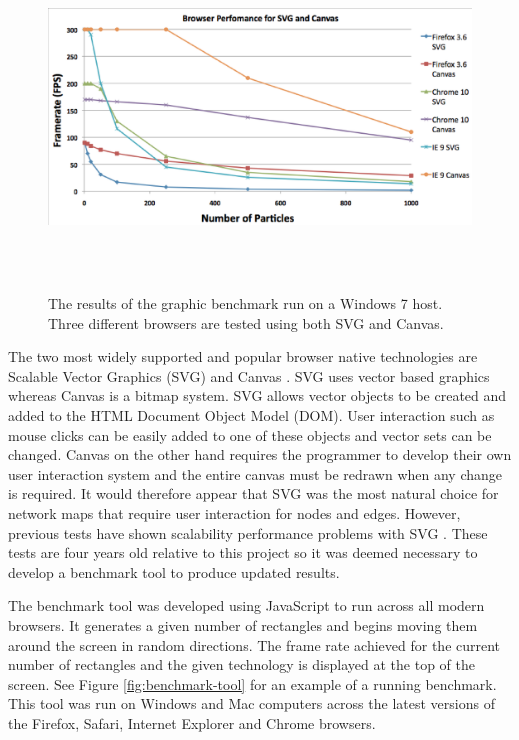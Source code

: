 \documentclass[11pt, a4paper]{article}
\begin{document}
\begin{figure}
\centering
\includegraphics[width=170mm,height=91.67mm]{assets/benchmark-graph.eps}
\caption{The results of the graphic benchmark run on a Windows 7 host. Three
different browsers are tested using both SVG and Canvas.}
\label{fig:benchmark-graph}
\end{figure}

The two most widely supported and popular browser native technologies are
Scalable Vector Graphics (SVG) \cite{Ferraiolo_2003} and Canvas
\cite{Canvas_website}. SVG uses vector based graphics whereas Canvas is a bitmap
system. SVG allows vector objects to be created and added to the HTML Document
Object Model (DOM). User interaction such as mouse clicks can be easily added to
one of these objects and vector sets can be changed. Canvas on the other hand
requires the programmer to develop their own user interaction system and the
entire canvas must be redrawn when any change is required. It would therefore
appear that SVG was the most natural choice for network maps that require user
interaction for nodes and edges. However, previous tests have shown scalability
performance problems with SVG \cite{Johnson_2008}. These tests are four years
old relative to this project so it was deemed necessary to develop a benchmark
tool to produce updated results.

The benchmark tool was developed using JavaScript to run across all modern
browsers. It generates a given number of rectangles and begins moving them
around the screen in random directions. The frame rate achieved for the current
number of rectangles and the given technology is displayed at the top of the
screen. See Figure \ref{fig:benchmark-tool} for an example of a running
benchmark. This tool was run on Windows and Mac computers across the latest
versions of the Firefox, Safari, Internet Explorer and Chrome browsers. 
\end{document}
